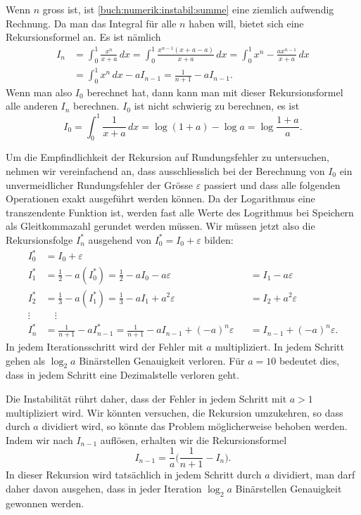 Wenn $n$ gross ist, ist \eqref{buch:numerik:instabil:summe}
eine ziemlich aufwendig Rechnung.
Da man das Integral für alle $n$ haben will, bietet sich eine
Rekursionsformel an.
%
Es ist nämlich
\begin{align*}
I_n
&=
\int_0^1 \frac{x^n}{x+a}\,dx
=
\int_0^1 \frac{x^{n-1}(x+a-a)}{x+a}\,dx
=
\int_0^1 x^n - \frac{ax^{n-1}}{x+a}\,dx
\\
&=
\int_0^1 x^n\,dx - aI_{n-1}
=
\frac1{n+1} - a I_{n-1}.
\end{align*}
Wenn man also $I_0$ berechnet hat, dann kann man mit dieser 
Rekursionsformel alle anderen $I_n$ berechnen.
$I_0$ ist nicht schwierig zu berechnen, es ist
\[
I_0 = \int_0^1 \frac{1}{x+a}\,dx = \log(1+a) - \log a = \log\frac{1+a}a.
\]

Um die Empfindlichkeit der Rekursion auf Rundungsfehler zu untersuchen,
nehmen wir vereinfachend an, dass ausschliesslich bei der Berechnung von
$I_0$ ein unvermeidlicher Rundungsfehler der Grösse $\varepsilon$ passiert
und dass alle folgenden Operationen exakt ausgeführt werden können.
Da der Logarithmus eine transzendente Funktion ist, werden fast alle Werte
des Logrithmus bei Speichern als Gleitkommazahl gerundet werden müssen.
%
Wir müssen jetzt also die Rekursionsfolge $I^*_n$ ausgehend von
$I_0^* = I_0+\varepsilon$
bilden:
\[
\begin{aligned}
I_0^* &= I_0 + \varepsilon
\\
I_1^* &= \frac12 - a(I_0^*) = \frac12-aI_0 - a\varepsilon
      &&=I_1 - a \varepsilon
\\
I_2^* &= \frac13 - a(I_1^*) = \frac13-aI_1 + a^2\varepsilon
      &&=I_2 + a^2 \varepsilon
\\
\vdots\;&\quad\vdots\\
I_n^* &= \frac{1}{n+1} -aI_{n-1}^* = \frac{1}{n+1} - aI_{n-1} + (-a)^n\varepsilon
      &&= I_{n-1} + (-a)^n\varepsilon.
\end{aligned}
\]
In jedem Iterationsschritt wird der Fehler mit $a$ multipliziert.
In jedem Schritt gehen als $\log_2a$ Binärstellen Genauigkeit verloren.
Für $a=10$ bedeutet dies, dass in jedem Schritt eine Dezimalstelle
verloren geht.

Die Instabilität rührt daher, dass der Fehler in jedem Schritt mit
$a>1$ multipliziert wird.
Wir könnten versuchen, die Rekursion umzukehren, so dass durch $a$ 
dividiert wird, so könnte das Problem möglicherweise behoben werden.
Indem wir nach $I_{n-1}$ auflösen, erhalten wir die Rekursionsformel
\[
I_{n-1} = \frac1{a} \biggl(
\frac{1}{n+1} -I_n\biggr).
\]
%
In dieser Rekursion wird tatsächlich in jedem Schritt durch $a$ dividiert,
man darf daher davon ausgehen, dass in jeder Iteration 
$\log_2a$ Binärstellen Genauigkeit gewonnen werden.

